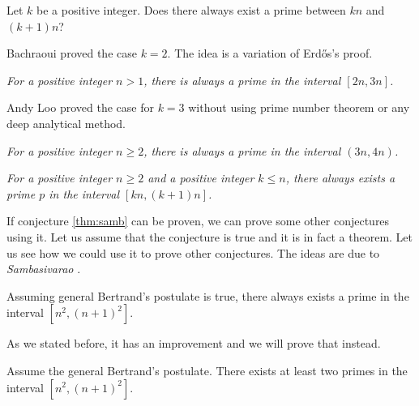 \documentclass{subfile}
\begin{document}
	\begin{problem}
		Let $k$ be a positive integer. Does there always exist a prime between $kn$ and $(k+1)n$?
	\end{problem}
Bachraoui \cite[Thm $1.3$]{bachraoui} proved the case $k=2$. The idea is a variation of Erd\H os's proof.
	\begin{theorem}[Bachraoui]\slshape
		For a positive integer $n>1$, there is always a prime in the interval $[2n,3n]$.
	\end{theorem}
Andy Loo \cite{loo} proved the case for $k=3$ without using prime number theorem or any deep analytical method.
	\begin{theorem}[Loo]\slshape
		For a positive integer $n\geq2$, there is always a prime in the interval $(3n,4n)$.
	\end{theorem}
	\begin{conjecture}\label{thm:samb}\slshape
		For a positive integer $n\geq2$ and a positive integer $k\leq n$, there always exists a prime $p$ in the interval $[kn,(k+1)n]$.
	\end{conjecture}
If conjecture \eqref{thm:samb} can be proven, we can prove some other conjectures using it. Let us assume that the conjecture is true and it is in fact a theorem. Let us see how we could use it to prove other conjectures. The ideas are due to \textit{Sambasivarao} \cite{samb}.
	\begin{theorem}
		Assuming general Bertrand's postulate is true, there always exists a prime in the interval $[n^2,(n+1)^2]$.
	\end{theorem}
As we stated before, it has an improvement and we will prove that instead.
	\begin{theorem}
		Assume the general Bertrand's postulate. There exists at least two primes in the interval $[n^2,(n+1)^2]$.
	\end{theorem}
	
\end{document}
